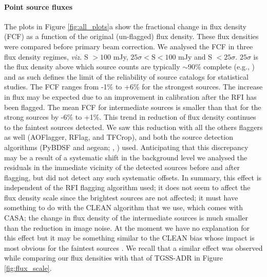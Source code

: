 \documentclass[twocolumn]{aastex61}
\begin{document}
{\begin{figure*}[htbp]
   \caption{Comparison of images generated using IPFLAG, AOflagger and with
   neither. Each row corresponds to a different target, while the 5 columns show
   from left to right, (a) Fractional change in flux as a function of
   original (pre-flagging) flux - only for IPFLAG; the solid line shows the
   median change separately for the strong (S $>$ 100 mJy), intermediate
   ($25\sigma < S < 100$ mJy) and faint (S $< 25\sigma$) sources. (b) Image
   noise as a function of radial distance from the phase centre (c) Image noise
   as a function of neighbourhood source flux (d) Histogram of image noise
   values from across the field and (e) Integral source counts. The results for
   IPFLAG, AOFlagger and ``Neither'' are shown in orange, pink and blue,
   respectively. Application of IPFLAG resulted in the detection of fainter
   sources as evidenced by the extension of source counts to lower flux
   densities.}
   \label{fig:all_plots}
\end{figure*}


\paragraph{Point source fluxes} The plots in Figure \ref{fig:all_plots}a
show the fractional change in flux density (FCF) as a function of the original
(un-flagged) flux density. These flux densities were compared before primary beam
correction. We analysed the FCF in three flux density regimes, \emph{viz.} S $>
100$ mJy, $25\sigma < \text{S} < 100$ mJy and S $< 25\sigma$.  $25\sigma$ is the
flux density above which source counts are typically $\sim$90\% complete (e.g.,
\citealt[][]{intema2017gmrt}) and as such defines the limit of the reliability
of source catalogs for statistical studies. The FCF ranges from -1\% to +6\% for
the strongest sources. The increase in flux may be expected due to an
improvement in calibration after the RFI has been flagged.  The mean FCF for
intermediate sources is smaller than that for the strong sources by -6\% to
+1\%. This trend in reduction of flux density continues to the faintest sources
detected. We saw this reduction with all the others flaggers as well (AOFlagger,
RFlag, and TFCrop), and both the source detection algorithms (PyBDSF and aegean;
\citealt[][]{mohan_pybdsf_2015}, \citealt[][]{hancock2012compact}) used.
Anticipating that this discrepancy may be a result of a systematic shift in the
background level we analysed the residuals in the immediate vicinity of the
detected sources before and after flagging, but did not detect any such
systematic offsets.  In summary, this effect is independent of the RFI flagging
algorithm used; it does not seem to affect the flux density scale since the
brightest sources are not affected; it must have something to do with the CLEAN
algorithm that we use, which comes with CASA; the change in flux density of the
intermediate sources is much smaller than the reduction in image noise. At the
moment we have no explanation for this effect but it may be something similar to
the CLEAN bias whose impact is most obvious for the faintest sources
\citep{condon1998nrao, cohen2007vla}. We recall that a similar effect was
observed while comparing our flux densities with that of TGSS-ADR in Figure
\ref{fig:flux_scale}.

}
\end{document}
